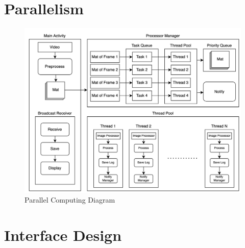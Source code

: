 \section{Parallelism}
    \begin{figure}[!ht]
        \includegraphics[width=6in]{images/chapter3/parallel.png}
        \caption{Parallel Computing Diagram}
        \label{systemOverview}
    \end{figure}
\section{Interface Design}